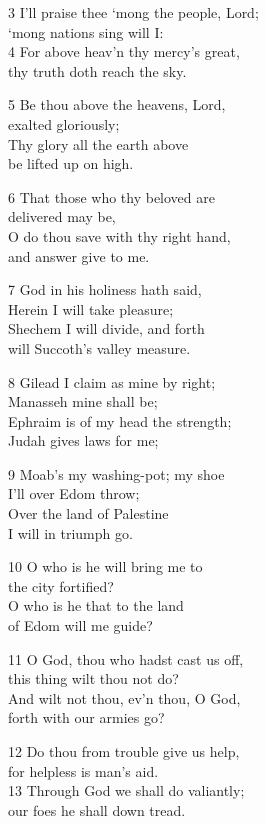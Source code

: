 3 I’ll praise thee ‘mong the people, Lord;\\
‘mong nations sing will I:\\
4 For above heav’n thy mercy’s great,\\
thy truth doth reach the sky.

5 Be thou above the heavens, Lord,\\
exalted gloriously;\\
Thy glory all the earth above\\
be lifted up on high.

6 That those who thy beloved are\\
delivered may be,\\
O do thou save with thy right hand,\\
and answer give to me.

7 God in his holiness hath said,\\
Herein I will take pleasure;\\
Shechem I will divide, and forth\\
will Succoth’s valley measure.

8 Gilead I claim as mine by right;\\
Manasseh mine shall be;\\
Ephraim is of my head the strength;\\
Judah gives laws for me;

9 Moab’s my washing-pot; my shoe\\
I’ll over Edom throw;\\
Over the land of Palestine\\
I will in triumph go.

10 O who is he will bring me to\\
the city fortified?\\
O who is he that to the land\\
of Edom will me guide?

11 O God, thou who hadst cast us off,\\
this thing wilt thou not do?\\
And wilt not thou, ev’n thou, O God,\\
forth with our armies go?

12 Do thou from trouble give us help,\\
for helpless is man’s aid.\\
13 Through God we shall do valiantly;\\
our foes he shall down tread.


\begin{center}
\quad{}\quad{}
\end{center}


